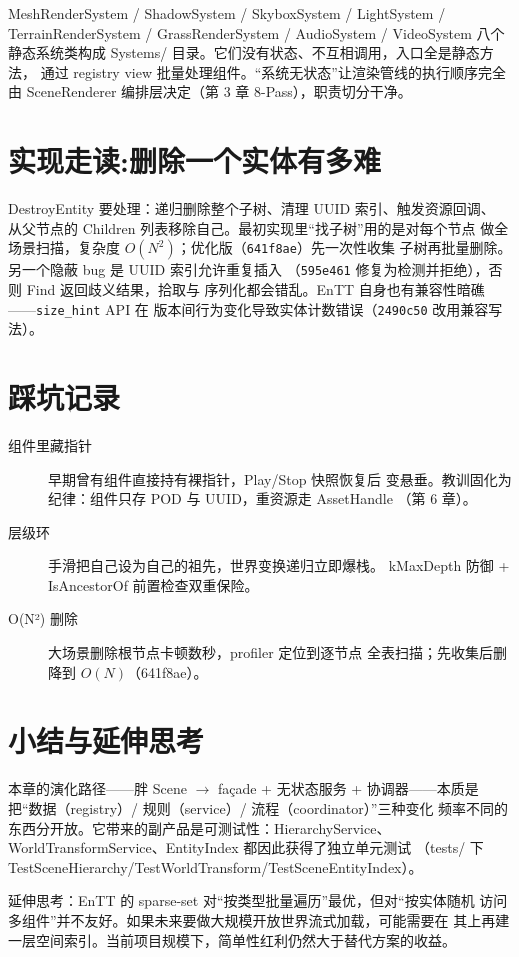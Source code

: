 MeshRenderSystem / ShadowSystem / SkyboxSystem / LightSystem /
TerrainRenderSystem / GrassRenderSystem / AudioSystem / VideoSystem 八个
静态系统类构成 Systems/ 目录。它们没有状态、不互相调用，入口全是静态方法，
通过 registry view 批量处理组件。``系统无状态''让渲染管线的执行顺序完全
由 SceneRenderer 编排层决定（第 3 章 8-Pass），职责切分干净。

\section{实现走读:删除一个实体有多难}

DestroyEntity 要处理：递归删除整个子树、清理 UUID 索引、触发资源回调、
从父节点的 Children 列表移除自己。最初实现里``找子树''用的是对每个节点
做全场景扫描，复杂度 $O(N^2)$；优化版（\texttt{641f8ae}）先一次性收集
子树再批量删除。另一个隐蔽 bug 是 UUID 索引允许重复插入
（\texttt{595e461} 修复为检测并拒绝），否则 Find 返回歧义结果，拾取与
序列化都会错乱。EnTT 自身也有兼容性暗礁——\texttt{size\_hint} API 在
版本间行为变化导致实体计数错误（\texttt{2490c50} 改用兼容写法）。

\section{踩坑记录}

\begin{description}
  \item[组件里藏指针] 早期曾有组件直接持有裸指针，Play/Stop 快照恢复后
        变悬垂。教训固化为纪律：组件只存 POD 与 UUID，重资源走 AssetHandle
        （第 6 章）。
  \item[层级环] 手滑把自己设为自己的祖先，世界变换递归立即爆栈。
        kMaxDepth 防御 + IsAncestorOf 前置检查双重保险。
  \item[O(N²) 删除] 大场景删除根节点卡顿数秒，profiler 定位到逐节点
        全表扫描；先收集后删降到 $O(N)$（641f8ae）。
\end{description}

\section{小结与延伸思考}

本章的演化路径——胖 Scene $\to$ façade + 无状态服务 + 协调器——本质是
把``数据（registry）/ 规则（service）/ 流程（coordinator）''三种变化
频率不同的东西分开放。它带来的副产品是可测试性：HierarchyService、
WorldTransformService、EntityIndex 都因此获得了独立单元测试
（tests/ 下 TestSceneHierarchy/TestWorldTransform/TestSceneEntityIndex）。

延伸思考：EnTT 的 sparse-set 对``按类型批量遍历''最优，但对``按实体随机
访问多组件''并不友好。如果未来要做大规模开放世界流式加载，可能需要在
其上再建一层空间索引。当前项目规模下，简单性红利仍然大于替代方案的收益。
